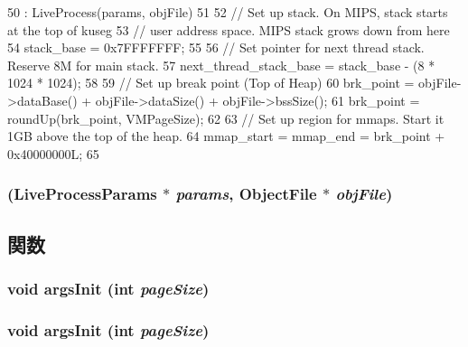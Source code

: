 \begin{DoxyCode}
50     : LiveProcess(params, objFile)
51 {
52     // Set up stack. On MIPS, stack starts at the top of kuseg
53     // user address space. MIPS stack grows down from here
54     stack_base = 0x7FFFFFFF;
55 
56     // Set pointer for next thread stack.  Reserve 8M for main stack.
57     next_thread_stack_base = stack_base - (8 * 1024 * 1024);
58 
59     // Set up break point (Top of Heap)
60     brk_point = objFile->dataBase() + objFile->dataSize() + objFile->bssSize();
61     brk_point = roundUp(brk_point, VMPageSize);
62 
63     // Set up region for mmaps.  Start it 1GB above the top of the heap.
64     mmap_start = mmap_end = brk_point + 0x40000000L;
65 }
\end{DoxyCode}
\hypertarget{classMipsLiveProcess_a57e08c5387f25b28fe0c146b0d7c8ab2}{
\subsubsection[{MipsLiveProcess}]{ (LiveProcessParams $\ast$ {\em params}, \/  {\bf ObjectFile} $\ast$ {\em objFile})}}
\label{classMipsLiveProcess_a57e08c5387f25b28fe0c146b0d7c8ab2}


\subsection{関数}
\hypertarget{classMipsLiveProcess_a2415a441aed245469460cac91152385e}{
\subsubsection[{argsInit}]{\setlength{\rightskip}{0pt plus 5cm}void argsInit (int {\em pageSize})}}
\label{classMipsLiveProcess_a2415a441aed245469460cac91152385e}
\hypertarget{classMipsLiveProcess_a2415a441aed245469460cac91152385e}{
\subsubsection[{argsInit}]{\setlength{\rightskip}{0pt plus 5cm}void argsInit (int {\em pageSize})}}
\label{classMipsLiveProcess_a2415a441aed245469460cac91152385e}



